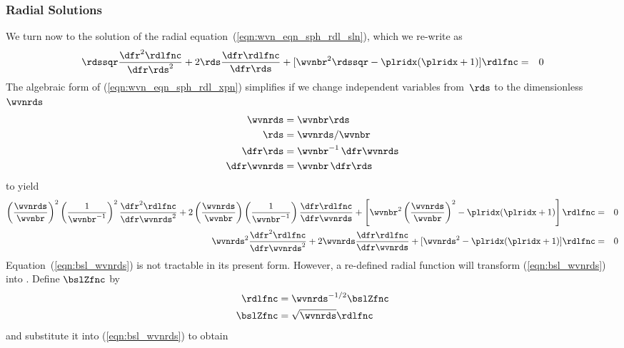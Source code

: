 \documentclass[12pt]{article}
\begin{document}
\subsubsection[Radial Solutions]{Radial Solutions}\label{sxn:mie_rdl}
We turn now to the solution of the radial
equation~(\ref{eqn:wvn_eqn_sph_rdl_sln}), which we re-write as  
\begin{eqnarray}
\rdssqr \frac{\dfr^{2}\rdlfnc}{\dfr\rds^{2}} +
2\rds \frac{\dfr\rdlfnc}{\dfr\rds} +
[ \wvnbr^{2}\rdssqr - \plridx(\plridx+1) ] \rdlfnc
& = & 0
\label{eqn:wvn_eqn_sph_rdl_xpn}
\end{eqnarray}
The algebraic form of (\ref{eqn:wvn_eqn_sph_rdl_xpn}) simplifies if we
change independent variables from~$\rds$ to the dimensionless~$\wvnrds$
\begin{subequations}
\begin{align}
\wvnrds & = \wvnbr\rds \\
\rds & = \wvnrds/\wvnbr \\
\dfr\rds & = \wvnbr^{-1} \,\dfr\wvnrds \\
\dfr\wvnrds & = \wvnbr \,\dfr\rds
\label{eqn:bsl_cov}
\end{align}
\end{subequations}
to yield
\begin{eqnarray}
\left( \frac{\wvnrds}{\wvnbr} \right)^{2}
\left( \frac{1}{\wvnbr^{-1}} \right)^{2}
\frac{\dfr^{2}\rdlfnc}{\dfr\wvnrds^{2}} +
2 \left( \frac{\wvnrds}{\wvnbr} \right)
\left( \frac{1}{\wvnbr^{-1}} \right)
\frac{\dfr\rdlfnc}{\dfr\wvnrds} +
\left[ \wvnbr^{2} 
\left( \frac{\wvnrds}{\wvnbr} \right)^{2}
- \plridx(\plridx+1) \right] \rdlfnc 
& = & 0 \nonumber \\
\wvnrds^{2} \frac{\dfr^{2}\rdlfnc}{\dfr\wvnrds^{2}} +
2 \wvnrds \frac{\dfr\rdlfnc}{\dfr\wvnrds} +
[ \wvnrds^{2} - \plridx(\plridx+1) ] \rdlfnc 
& = & 0
\label{eqn:bsl_wvnrds}
\end{eqnarray}
Equation~(\ref{eqn:bsl_wvnrds}) is not tractable in its present form.
However, a re-defined radial function will transform
(\ref{eqn:bsl_wvnrds}) into .
Define $\bslZfnc$ by
\begin{subequations}
\begin{align}
\rdlfnc & = \wvnrds^{-1/2} \bslZfnc \\
\bslZfnc & = \sqrt{\wvnrds} \rdlfnc 
\label{eqn:bsl_cov}
\end{align}
\end{subequations}
and substitute it into (\ref{eqn:bsl_wvnrds}) to obtain
\end{document}
